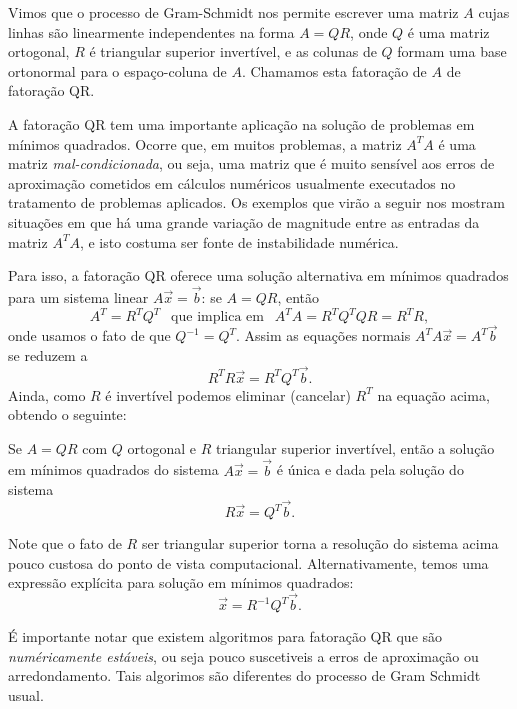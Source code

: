 Vimos que o processo de Gram-Schmidt nos permite escrever uma matriz $A$ cujas linhas são linearmente independentes na forma $A=QR$, onde $Q$ é uma matriz ortogonal, $R$ é triangular superior invertível, e as colunas de $Q$ formam uma base ortonormal para o espaço-coluna de $A$. Chamamos esta fatoração de $A$ de fatoração QR. 

A fatoração QR tem uma importante aplicação na solução de problemas em mínimos quadrados. Ocorre que, em muitos problemas, a matriz $A^T A$ é uma matriz {\it mal-condicionada}, ou seja, uma matriz que é muito sensível aos erros de aproximação cometidos em cálculos numéricos usualmente executados no tratamento de problemas aplicados. 
Os exemplos que virão a seguir nos mostram situações em que há uma grande variação de magnitude entre as entradas da matriz $A^T A$, e isto costuma ser fonte de instabilidade numérica.

Para isso, a fatoração QR oferece uma solução alternativa em mínimos quadrados para um sistema linear $A\vec{x}= \vec{b}$:
se $A=QR$, então 
\begin{equation}
A^T=R^T Q^T
\ \ \mbox{ que implica em } \ \
A^T A= R^T Q^T Q R= R^T R,
\end{equation}
onde usamos o fato de que $Q^{-1}=Q^T$.
Assim as equações normais $A^T A \vec{x} = A^T \vec{b}$ se reduzem a 
\begin{equation} R^T R \vec{x} = R^T Q^T \vec{b}.\end{equation}
Ainda, como $R$ é invertível podemos eliminar (cancelar) $R^T$ na equação acima, %
obtendo o seguinte:
\begin{teo}
	Se $A=QR$ com $Q$ ortogonal e $R$ triangular superior invertível, então 
	a solução em mínimos quadrados do sistema $A\vec{x}= \vec{b}$ é única e dada pela solução do sistema
	\begin{equation}  R \vec{x} =  Q^T \vec{b}.\end{equation}
\end{teo}

Note que o fato de $R$ ser triangular superior torna a resolução do sistema acima pouco custosa do ponto de vista computacional. Alternativamente, temos uma expressão explícita para solução em mínimos quadrados: \begin{equation}   \vec{x} = R^{-1} Q^T \vec{b}.\end{equation}

É importante notar que existem algoritmos para fatoração QR que são \textit{numéricamente estáveis}, ou seja pouco suscetiveis a erros de aproximação ou arredondamento. Tais algorimos são diferentes do processo de Gram Schmidt usual.





% 